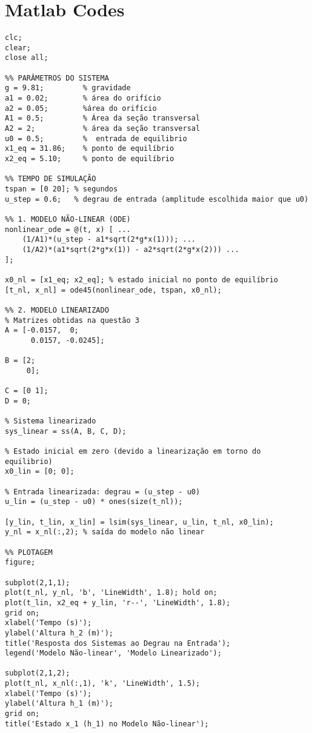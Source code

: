 \documentclass[12pt,a4]{article}
\begin{document}
\section{Matlab Codes}
\begin{lstlisting}[style=matlabstyle]
clc;
clear;
close all;

%% PARÂMETROS DO SISTEMA
g = 9.81;         % gravidade      
a1 = 0.02;        % área do orifício     
a2 = 0.05;        %área do orifício    
A1 = 0.5;         % Área da seção transversal     
A2 = 2;           % área da seção transversal     
u0 = 0.5;         %  entrada de equilibrio
x1_eq = 31.86;    % ponto de equilíbrio
x2_eq = 5.10;     % ponto de equilíbrio

%% TEMPO DE SIMULAÇÃO
tspan = [0 20]; % segundos
u_step = 0.6;   % degrau de entrada (amplitude escolhida maior que u0)

%% 1. MODELO NÃO-LINEAR (ODE)
nonlinear_ode = @(t, x) [ ...
    (1/A1)*(u_step - a1*sqrt(2*g*x(1))); ...
    (1/A2)*(a1*sqrt(2*g*x(1)) - a2*sqrt(2*g*x(2))) ...
];

x0_nl = [x1_eq; x2_eq]; % estado inicial no ponto de equilíbrio
[t_nl, x_nl] = ode45(nonlinear_ode, tspan, x0_nl);

%% 2. MODELO LINEARIZADO
% Matrizes obtidas na questão 3
A = [-0.0157,  0;
      0.0157, -0.0245];

B = [2;
     0];

C = [0 1];
D = 0;

% Sistema linearizado
sys_linear = ss(A, B, C, D);

% Estado inicial em zero (devido a linearização em torno do equilibrio)
x0_lin = [0; 0]; 

% Entrada linearizada: degrau = (u_step - u0)
u_lin = (u_step - u0) * ones(size(t_nl));

[y_lin, t_lin, x_lin] = lsim(sys_linear, u_lin, t_nl, x0_lin);
y_nl = x_nl(:,2); % saída do modelo não linear

%% PLOTAGEM
figure;

subplot(2,1,1);
plot(t_nl, y_nl, 'b', 'LineWidth', 1.8); hold on;
plot(t_lin, x2_eq + y_lin, 'r--', 'LineWidth', 1.8);
grid on;
xlabel('Tempo (s)');
ylabel('Altura h_2 (m)');
title('Resposta dos Sistemas ao Degrau na Entrada');
legend('Modelo Não-linear', 'Modelo Linearizado');

subplot(2,1,2);
plot(t_nl, x_nl(:,1), 'k', 'LineWidth', 1.5);
xlabel('Tempo (s)');
ylabel('Altura h_1 (m)');
grid on;
title('Estado x_1 (h_1) no Modelo Não-linear');



\end{lstlisting}
\end{document}
